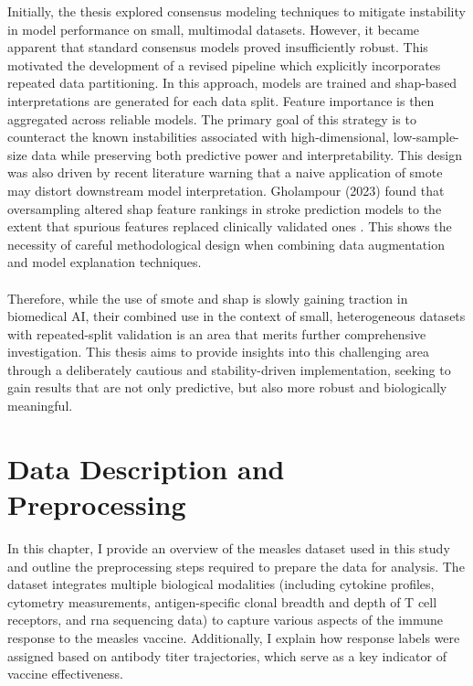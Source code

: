 \documentclass[12pt,a4paper]{report}
\begin{document}
Initially, the thesis explored consensus modeling techniques to mitigate instability in model performance on small, multimodal datasets. However, it became apparent that standard consensus models proved insufficiently robust. This motivated the development of a revised pipeline which explicitly incorporates repeated data partitioning. In this approach, models are trained and \acrshort{shap}-based interpretations are generated for each data split. Feature importance is then aggregated across reliable models. The primary goal of this strategy is to counteract the known instabilities associated with high-dimensional, low-sample-size data while preserving both predictive power and interpretability. This design was also driven by recent literature warning that a naive application of \acrshort{smote} may distort downstream model interpretation. Gholampour (2023) found that oversampling altered \acrshort{shap} feature rankings in stroke prediction models to the extent that spurious features replaced clinically validated ones \cite{gholampour2024impact}. This shows the necessity of careful methodological design when combining data augmentation and model explanation techniques.\\
\\
Therefore, while the use of \acrshort{smote} and \acrshort{shap} is slowly gaining traction in biomedical AI, their combined use in the context of small, heterogeneous datasets with repeated-split validation is an area that merits further comprehensive investigation. This thesis aims to provide insights into this challenging area through a deliberately cautious and stability-driven implementation, seeking to gain results that are not only predictive, but also more robust and biologically meaningful.







\pagebreak
\chapter{Data Description and Preprocessing}
\noindent
In this chapter, I provide an overview of the measles dataset used in this study and outline the preprocessing steps required to prepare the data for analysis. The dataset integrates multiple biological modalities (including cytokine profiles, cytometry measurements, antigen-specific clonal breadth and depth of T cell receptors, and \acrshort{rna} sequencing data) to capture various aspects of the immune response to the measles vaccine. Additionally, I explain how response labels were assigned based on antibody titer trajectories, which serve as a key indicator of vaccine effectiveness.
\end{document}
